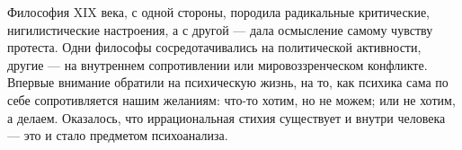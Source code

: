 
Философия XIX века, с одной стороны, породила радикальные критические, нигилистические настроения, а с другой --- дала осмысление самому чувству протеста. Одни философы сосредотачивались на политической активности, другие --- на внутреннем сопротивлении или мировоззренческом конфликте. Впервые внимание обратили на психическую жизнь, на то, как психика сама по себе сопротивляется нашим желаниям: что-то хотим, но не можем; или не хотим, а делаем. Оказалось, что иррациональная стихия существует и внутри человека --- это и стало предметом психоанализа.

